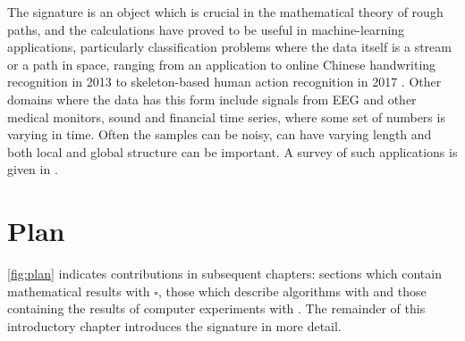 
The signature is an object which is crucial in the mathematical theory of rough paths\cite{Lyons98}, and the calculations have proved to be useful in machine-learning applications, particularly classification problems where the data itself is a stream or a path in space, ranging from an application to online Chinese handwriting recognition in 2013 \cite{BEN} to skeleton-based human action recognition in 2017 \cite{action}. Other domains where the data has this form include signals from EEG and other medical monitors, sound and financial time series, where some set of numbers is varying in time. Often the samples can be noisy, can have varying length and both local and global structure can be important. A survey of such applications is given in \cite{OxSigIntro}. 
\section{Plan}
\newcommand{\jrmath}{$\square$}
\newcommand{\jralgo}{\faListOl}%
\newcommand{\jrresults}{\faTable}%
\newcommand*{\fullref}[1]{\hyperref[{#1}]{\ref*{#1} \nameref*{#1}}}
\autoref{fig:plan} indicates contributions in subsequent chapters: sections which contain mathematical results with \jrmath,
those which describe algorithms with \jralgo{}
and those containing the results of computer experiments with \jrresults. The remainder of this introductory chapter introduces the signature in more detail.

